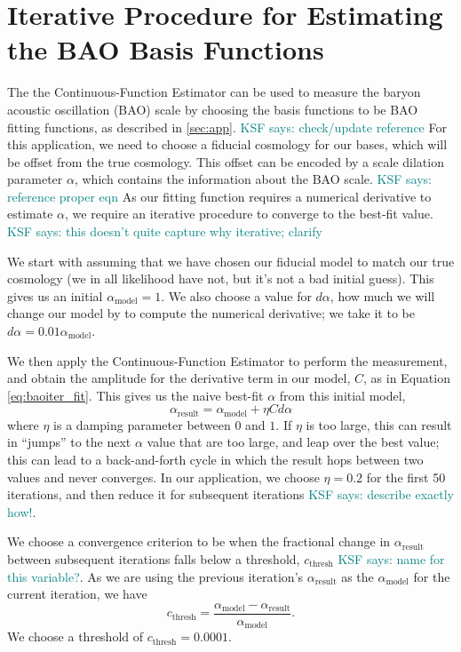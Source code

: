 \documentclass[modern]{aastex62}
\newcommand{\est}{the Continuous-Function Estimator\xspace}
\newcommand{\KSF}[1]{\textcolor{teal}{KSF says: #1}}
\begin{document}
\section{Iterative Procedure for Estimating the BAO Basis Functions}\label{sec:baoiter}

The \est can be used to measure the baryon acoustic oscillation (BAO) scale by choosing the basis functions to be BAO fitting functions, as described in \ref{sec:app}. \KSF{check/update reference}
For this application, we need to choose a fiducial cosmology for our bases, which will be offset from the true cosmology.
This offset can be encoded by a scale dilation parameter $\alpha$, which contains the information about the BAO scale. \KSF{reference proper eqn}
As our fitting function requires a numerical derivative to estimate $\alpha$, we require an iterative procedure to converge to the best-fit value. \KSF{this doesn't quite capture why iterative; clarify}

We start with assuming that we have chosen our fiducial model to match our true cosmology (we in all likelihood have not, but it's not a bad initial guess).
This gives us an initial $\alpha_\mathrm{model} = 1$. 
We also choose a value for $d\alpha$, how much we will change our model by to compute the numerical derivative; we take it to be $d\alpha=0.01\alpha_\mathrm{model}$. 

We then apply \est to perform the measurement, and obtain the amplitude for the derivative term in our model, $C$, as in Equation \ref{eq:baoiter_fit}. 
This gives us the naive best-fit $\alpha$ from this initial model,
\begin{equation}
    \alpha_\mathrm{result} = \alpha_\mathrm{model} + \eta C d\alpha
\end{equation}
where $\eta$ is a damping parameter between $0$ and $1$.
If $\eta$ is too large, this can result in ``jumps'' to the next $\alpha$ value that are too large, and leap over the best value; this can lead to a back-and-forth cycle in which the result hops between two values and never converges.
In our application, we choose $\eta=0.2$ for the first 50 iterations, and then reduce it for subsequent iterations \KSF{describe exactly how!}.

We choose a convergence criterion to be when the fractional change in $\alpha_\mathrm{result}$ between subsequent iterations falls below a threshold, $c_\mathrm{thresh}$ \KSF{name for this variable?}.
As we are using the previous iteration's $\alpha_\mathrm{result}$ as the $\alpha_\mathrm{model}$ for the current iteration, we have
\begin{equation}
    c_\mathrm{thresh} = \frac{\alpha_\mathrm{model} - \alpha_\mathrm{result}}{\alpha_\mathrm{model}}.
\end{equation}
We choose a threshold of $c_\mathrm{thresh} = 0.0001$.
\end{document}
